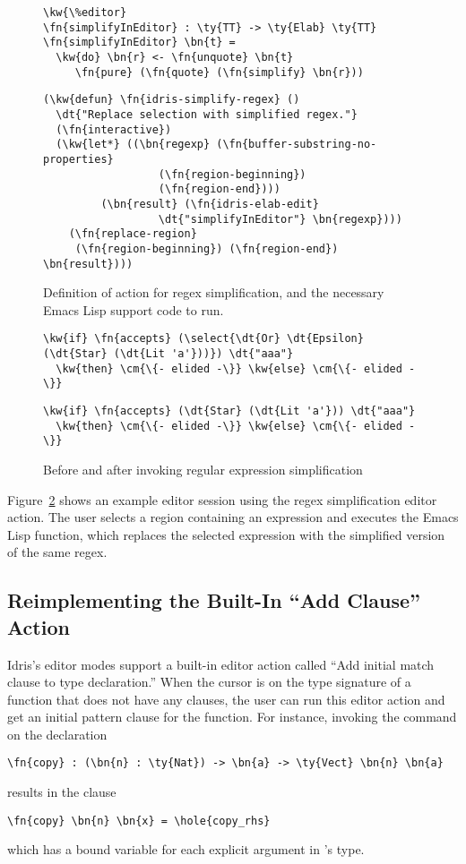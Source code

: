 \begin{figure}[ht]
\begin{Verbatim}
\kw{\%editor}
\fn{simplifyInEditor} : \ty{TT} -> \ty{Elab} \ty{TT}
\fn{simplifyInEditor} \bn{t} =
  \kw{do} \bn{r} <- \fn{unquote} \bn{t}
     \fn{pure} (\fn{quote} (\fn{simplify} \bn{r}))
\end{Verbatim}
\hrulefill
\begin{Verbatim}
(\kw{defun} \fn{idris-simplify-regex} ()
  \dt{"Replace selection with simplified regex."}
  (\fn{interactive})
  (\kw{let*} ((\bn{regexp} (\fn{buffer-substring-no-properties}
                  (\fn{region-beginning})
                  (\fn{region-end})))
         (\bn{result} (\fn{idris-elab-edit}
                  \dt{"simplifyInEditor"} \bn{regexp})))
    (\fn{replace-region}
     (\fn{region-beginning}) (\fn{region-end}) \bn{result})))
\end{Verbatim}
\caption{Definition of \Elab{} action for regex simplification, and the
  necessary Emacs Lisp support code to run.}
\label{code:regexElab}
\end{figure}


\begin{figure}[ht]
\begin{Verbatim}
\kw{if} \fn{accepts} (\select{\dt{Or} \dt{Epsilon} (\dt{Star} (\dt{Lit 'a'}))}) \dt{"aaa"}
  \kw{then} \cm{\{- elided -\}} \kw{else} \cm{\{- elided -\}}
\end{Verbatim}
  \vspace{1em}
\begin{Verbatim}
\kw{if} \fn{accepts} (\dt{Star} (\dt{Lit 'a'})) \dt{"aaa"}
  \kw{then} \cm{\{- elided -\}} \kw{else} \cm{\{- elided -\}}
\end{Verbatim}
\caption{Before and after invoking regular expression simplification}
  \label{fig:regex-example}
\end{figure}

Figure~\ref{fig:regex-example} shows an example editor session using the regex
simplification editor action. The user selects a region containing an
expression and executes the Emacs Lisp function, which replaces the selected
expression with the simplified version of the same regex.

\subsection{Reimplementing the Built-In ``Add Clause'' Action}\label{sec:addClause}

Idris's editor modes support a built-in editor action called ``Add initial match
clause to type declaration.'' When the cursor is on the type signature of a
function that does not have any clauses, the user can run this editor action
and get an initial pattern clause for the function.
For instance, invoking the command on the declaration
\begin{Verbatim}
\fn{copy} : (\bn{n} : \ty{Nat}) -> \bn{a} -> \ty{Vect} \bn{n} \bn{a}
\end{Verbatim}
results in the clause
\begin{Verbatim}
\fn{copy} \bn{n} \bn{x} = \hole{copy_rhs}
\end{Verbatim}
which has a bound variable for each explicit argument in 's type.

